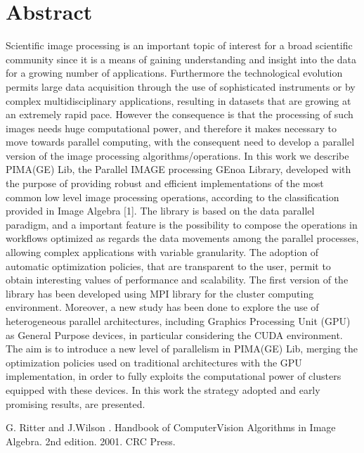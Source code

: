 \documentclass[article, A4, 11pt]{llncs}%
\begin{document}
\section*{Abstract}
Scientific image processing is an important topic of interest for a broad scientific community since it is a means of gaining understanding and insight into the data for a growing number of applications. Furthermore the technological evolution permits large data acquisition through the use of sophisticated instruments or by complex multidisciplinary applications, resulting in datasets that are growing at an extremely rapid pace. However the consequence is that the processing of such images needs huge computational power, and therefore it makes necessary to move towards parallel computing, with the consequent need to develop a parallel version of the image processing algorithms/operations. In this work we describe PIMA(GE) Lib, the Parallel IMAGE processing GEnoa Library, developed with the purpose of providing robust and efficient implementations of the most common low level image processing operations, according to the classification provided in Image Algebra [1]. The library is based on the data parallel paradigm, and a important feature is the possibility to compose the operations in workflows optimized as regards the data movements among the parallel processes, allowing complex applications with variable granularity. The adoption of automatic optimization policies, that are transparent to the user, permit to obtain interesting values of performance and scalability.  The first version of the library has been developed using MPI library for the cluster computing environment. Moreover, a new study has been done to explore the use of heterogeneous parallel architectures, including Graphics Processing Unit (GPU) as General Purpose devices, in particular considering the CUDA environment. The aim is to introduce a  new level of parallelism in PIMA(GE) Lib, merging the optimization policies used on traditional architectures with the GPU implementation, in order to fully exploits the computational power of clusters equipped with these devices.  In this work the strategy adopted and early promising results, are presented. 



\begin{thebibliography}{10}
{\sc G. Ritter and J.Wilson }. {Handbook of ComputerVision Algorithms in Image Algebra}. 2nd edition. 2001. CRC Press.
\end{thebibliography} %
\end{document}
